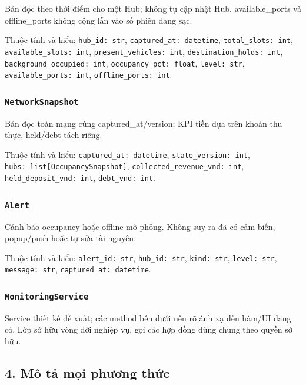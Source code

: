 \documentclass[11pt,a4paper]{article}
\begin{document}
Bản đọc theo thời điểm cho một Hub; không tự cập nhật Hub.
available\_ports và offline\_ports không cộng lẫn vào số phiên đang sạc.

Thuộc tính và kiểu: \texttt{hub\_id:\ str},
\texttt{captured\_at:\ datetime}, \texttt{total\_slots:\ int},
\texttt{available\_slots:\ int}, \texttt{present\_vehicles:\ int},
\texttt{destination\_holds:\ int}, \texttt{background\_occupied:\ int},
\texttt{occupancy\_pct:\ float}, \texttt{level:\ str},
\texttt{available\_ports:\ int}, \texttt{offline\_ports:\ int}.

\hypertarget{networksnapshot}{%
\subsubsection{\texorpdfstring{\texttt{NetworkSnapshot}}{NetworkSnapshot}}\label{networksnapshot}}

Bản đọc toàn mạng cùng captured\_at/version; KPI tiền dựa trên khoản thu
thực, held/debt tách riêng.

Thuộc tính và kiểu: \texttt{captured\_at:\ datetime},
\texttt{state\_version:\ int},
\texttt{hubs:\ list{[}OccupancySnapshot{]}},
\texttt{collected\_revenue\_vnd:\ int},
\texttt{held\_deposit\_vnd:\ int}, \texttt{debt\_vnd:\ int}.

\hypertarget{alert}{%
\subsubsection{\texorpdfstring{\texttt{Alert}}{Alert}}\label{alert}}

Cảnh báo occupancy hoặc offline mô phỏng. Không suy ra đã có cảm biến,
popup/push hoặc tự sửa tài nguyên.

Thuộc tính và kiểu: \texttt{alert\_id:\ str}, \texttt{hub\_id:\ str},
\texttt{kind:\ str}, \texttt{level:\ str}, \texttt{message:\ str},
\texttt{captured\_at:\ datetime}.

\hypertarget{monitoringservice}{%
\subsubsection{\texorpdfstring{\texttt{MonitoringService}}{MonitoringService}}\label{monitoringservice}}

Service thiết kế đề xuất; các method bên dưới nêu rõ ánh xạ đến hàm/UI
đang có. Lớp sở hữu vòng đời nghiệp vụ, gọi các hợp đồng dùng chung theo
quyền sở hữu.

\hypertarget{muxf4-tux1ea3-mux1ecdi-phux1b0ux1a1ng-thux1ee9c}{%
\subsection{4. Mô tả mọi phương
thức}\label{muxf4-tux1ea3-mux1ecdi-phux1b0ux1a1ng-thux1ee9c}}
\end{document}
